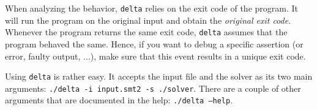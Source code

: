 When analyzing the behavior, \texttt{delta} relies on the exit code of the program.
It will run the program on the original input and obtain the \emph{original exit code}.
Whenever the program returns the same exit code, \texttt{delta} assumes that the program behaved the same.
Hence, if you want to debug a specific assertion (or error, faulty output, ...), make sure that this event results in a unique exit code.

Using \texttt{delta} is rather easy.
It accepts the input file and the solver as its two main arguments: \texttt{./delta -i input.smt2 -s ./solver}.
There are a couple of other arguments that are documented in the help: \texttt{./delta --help}.

